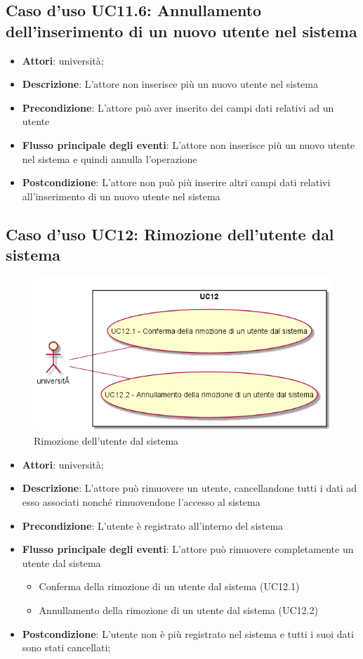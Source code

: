 \subsection{Caso d'uso \texorpdfstring{UC11.6}{UC11.6}: Annullamento dell'inserimento di un nuovo utente nel sistema}
\begin{itemize}
\item \textbf{Attori}: università;
\item \textbf{Descrizione}: L'attore non inserisce più un nuovo utente nel sistema
\item \textbf{Precondizione}: L'attore può aver inserito dei campi dati relativi ad un utente
\item \textbf{Flusso principale degli eventi}: L'attore non inserisce più un nuovo utente nel sistema e quindi annulla l'operazione
\item \textbf{Postcondizione}: L'attore non può più inserire altri campi dati relativi all'inserimento di un nuovo utente nel sistema
\end{itemize}
\subsection{Caso d'uso \texorpdfstring{UC12}{UC12}: Rimozione dell'utente dal sistema}
\begin{figure} [H]
\centering
\includegraphics[scale=0.45]{./img/UC12.png}
\caption{Rimozione dell'utente dal sistema}\label{}
\end{figure}
\begin{itemize}
\item \textbf{Attori}: università;
\item \textbf{Descrizione}: L'attore può rimuovere un utente, cancellandone tutti i dati ad esso associati nonché rimuovendone l'accesso al sistema
\item \textbf{Precondizione}: L'utente è registrato all'interno del sistema
\item \textbf{Flusso principale degli eventi}: L'attore può rimuovere completamente un utente dal sistema
\begin{itemize}
\item Conferma della rimozione di un utente dal sistema (UC12.1)
\item Annullamento della rimozione di un utente dal sistema (UC12.2)
\end{itemize}
\item \textbf{Postcondizione}: L'utente non è più registrato nel sistema e tutti i suoi dati sono stati cancellati;
\end{itemize}
